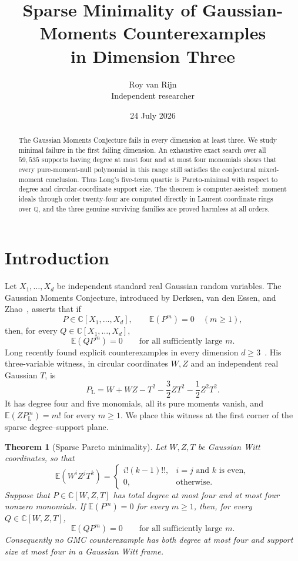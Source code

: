 \documentclass[11pt]{article}
\title{Sparse Minimality of Gaussian-Moments Counterexamples\\
in Dimension Three}
\author{Roy van Rijn\\{\small Independent researcher}}
\date{24 July 2026}
\newtheorem{theorem}{Theorem}[section]
\newcommand{\C}{\mathbb C}
\newcommand{\E}{\mathbb E}
\begin{document}
\maketitle

\begin{abstract}
The Gaussian Moments Conjecture fails in every dimension at least three.
We study minimal failure in the first failing dimension.  An exhaustive
exact search over all \(59{,}535\) supports having degree at most four and
at most four monomials shows that every pure-moment-null polynomial in this
range still satisfies the conjectural mixed-moment conclusion.  Thus
Long's five-term quartic is Pareto-minimal with respect to degree and
circular-coordinate support size.  The theorem is computer-assisted:
moment ideals through order twenty-four are computed directly in Laurent
coordinate rings over \(\mathbb Q\), and the three genuine surviving
families are proved harmless at all orders.
\end{abstract}

\section{Introduction}

Let \(X_1,\ldots,X_d\) be independent standard real Gaussian random
variables.  The Gaussian Moments Conjecture, introduced by Derksen, van den
Essen, and Zhao~\cite{DVZ}, asserts that if
\[
  P\in\C[X_1,\ldots,X_d],
  \qquad \E(P^m)=0\quad(m\geq1),
\]
then, for every \(Q\in\C[X_1,\ldots,X_d]\),
\[
  \E(QP^m)=0
  \qquad\text{for all sufficiently large }m.
\]
Long recently found explicit counterexamples in every dimension
\(d\geq3\)~\cite{Long}.  His three-variable witness, in circular
coordinates \(W,Z\) and an independent real Gaussian \(T\), is
\begin{equation}\label{eq:long}
 P_{\mathrm L}
 =W+WZ-T^2-\frac32ZT^2-\frac12Z^2T^2.
\end{equation}
It has degree four and five monomials, all its pure moments vanish, and
\(\E(ZP_{\mathrm L}^m)=m!\) for every \(m\geq1\).  We place this witness at
the first corner of the sparse degree--support plane.

\begin{theorem}[Sparse Pareto minimality]\label{thm:sparse}
Let \(W,Z,T\) be Gaussian Witt coordinates, so that
\[
 \E(W^iZ^jT^k)=
 \begin{cases}
   i!(k-1)!!,&i=j\text{ and }k\text{ is even},\\
   0,&\text{otherwise}.
 \end{cases}
\]
Suppose that \(P\in\C[W,Z,T]\) has total degree at most four and at most four
nonzero monomials.  If \(\E(P^m)=0\) for every \(m\geq1\), then, for every
\(Q\in\C[W,Z,T]\),
\[
 \E(QP^m)=0
 \qquad\text{for all sufficiently large }m.
\]
Consequently no GMC counterexample has both degree at most four and support
size at most four in a Gaussian Witt frame.
\end{theorem}
\end{document}
